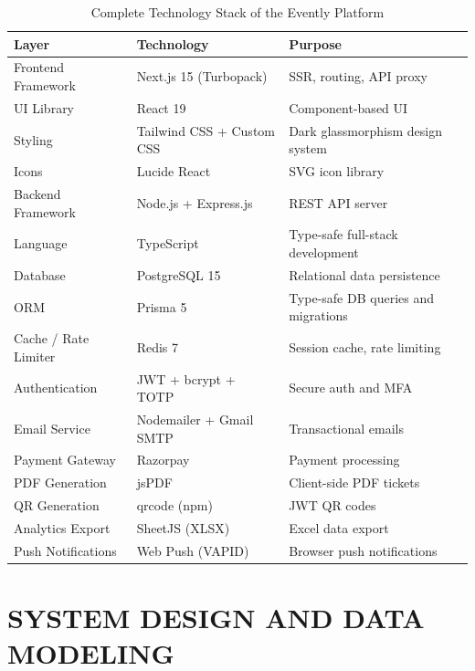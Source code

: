 \documentclass[12pt,a4paper]{report}
\begin{document}
\begin{table}[H]
    \centering
    \caption{Complete Technology Stack of the Evently Platform}
    \vspace{0.2cm}
    \begin{tabular}{|p{3.5cm}|p{4cm}|p{5.5cm}|}
        \hline
        \textbf{Layer} & \textbf{Technology} & \textbf{Purpose} \\
        \hline
        Frontend Framework & Next.js 15 (Turbopack) & SSR, routing, API proxy \\
        \hline
        UI Library & React 19 & Component-based UI \\
        \hline
        Styling & Tailwind CSS + Custom CSS & Dark glassmorphism design system \\
        \hline
        Icons & Lucide React & SVG icon library \\
        \hline
        Backend Framework & Node.js + Express.js & REST API server \\
        \hline
        Language & TypeScript & Type-safe full-stack development \\
        \hline
        Database & PostgreSQL 15 & Relational data persistence \\
        \hline
        ORM & Prisma 5 & Type-safe DB queries and migrations \\
        \hline
        Cache / Rate Limiter & Redis 7 & Session cache, rate limiting \\
        \hline
        Authentication & JWT + bcrypt + TOTP & Secure auth and MFA \\
        \hline
        Email Service & Nodemailer + Gmail SMTP & Transactional emails \\
        \hline
        Payment Gateway & Razorpay & Payment processing \\
        \hline
        PDF Generation & jsPDF & Client-side PDF tickets \\
        \hline
        QR Generation & qrcode (npm) & JWT QR codes \\
        \hline
        Analytics Export & SheetJS (XLSX) & Excel data export \\
        \hline
        Push Notifications & Web Push (VAPID) & Browser push notifications \\
        \hline
    \end{tabular}
\end{table}
\chapter{SYSTEM DESIGN AND DATA MODELING}
\end{document}
